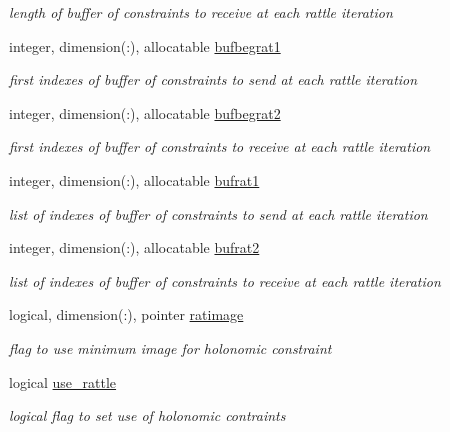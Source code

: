 \begin{DoxyCompactItemize}
\begin{DoxyCompactList}\small\item\em length of buffer of constraints to receive at each rattle iteration \end{DoxyCompactList}\item 
integer, dimension(\-:), allocatable \hyperlink{classfreeze_abf03e0ad8c7616beb64a0246d4ff5f27}{bufbegrat1}
\begin{DoxyCompactList}\small\item\em first indexes of buffer of constraints to send at each rattle iteration \end{DoxyCompactList}\item 
integer, dimension(\-:), allocatable \hyperlink{classfreeze_abae423316a32486c4f872f881ee1159e}{bufbegrat2}
\begin{DoxyCompactList}\small\item\em first indexes of buffer of constraints to receive at each rattle iteration \end{DoxyCompactList}\item 
integer, dimension(\-:), allocatable \hyperlink{classfreeze_aee10fb1491d873aef4531b069c5736a1}{bufrat1}
\begin{DoxyCompactList}\small\item\em list of indexes of buffer of constraints to send at each rattle iteration \end{DoxyCompactList}\item 
integer, dimension(\-:), allocatable \hyperlink{classfreeze_a5a0cbbf569f96d7c28eaa7990e99b858}{bufrat2}
\begin{DoxyCompactList}\small\item\em list of indexes of buffer of constraints to receive at each rattle iteration \end{DoxyCompactList}\item 
logical, dimension(\-:), pointer \hyperlink{classfreeze_a07586f65c5462b97a2f1b6a9ff6a0616}{ratimage}
\begin{DoxyCompactList}\small\item\em flag to use minimum image for holonomic constraint \end{DoxyCompactList}\item 
logical \hyperlink{classfreeze_a2f54ed0af4a00111bc9bebd6f458247f}{use\-\_\-rattle}
\begin{DoxyCompactList}\small\item\em logical flag to set use of holonomic contraints \end{DoxyCompactList}\item 

\end{DoxyCompactItemize}
